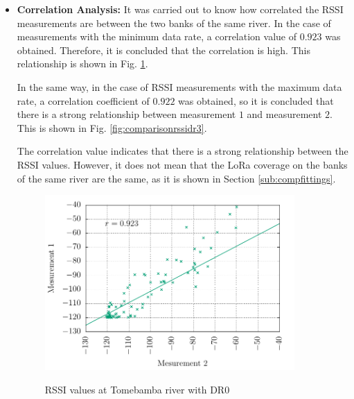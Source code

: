 \begin{itemize}

\item \textbf{Correlation Analysis:} It was carried out to know how correlated the RSSI measurements are between the two banks of the same river.
In the case of measurements with the minimum data rate, a correlation value of $0.923$ was obtained. Therefore, it is concluded that the correlation is high. This relationship is shown in Fig. \ref{fig:comparisonrssidr0}.


In the same way, in the case of RSSI measurements with the maximum data rate, a correlation coefficient of $0.922$ was obtained, so it is concluded that there is a strong relationship between measurement $1$ and measurement $2$. This is shown in Fig. \ref{fig:comparisonrssidr3}.


The correlation value indicates that there is a strong relationship between the RSSI values. However, it does not mean that the LoRa coverage on the banks of the same river are the same, as it is shown in Section \ref{sub:compfittings}.

\begin{figure}[h!]
    \centering
      \includegraphics[width=0.9\textwidth]{Figure6}
      \label{fig:comparisonrssidr0}
      \caption{RSSI values at Tomebamba river with DR$0$}
\end{figure}


\end{itemize}
